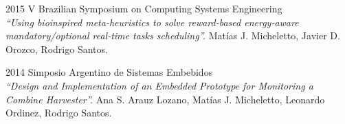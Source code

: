 \documentclass[letterpaper]{twentysecondcv} %
\begin{document}
\begin{twenty}
\twentyitem
    {2015}
    {}
    {V Brazilian Symposium on Computing Systems Engineering\\}
    {\textit{``Using bioinspired meta-heuristics to solve reward-based energy-aware mandatory/optional real-time tasks scheduling''.}}
    {Matías J. Micheletto, Javier D. Orozco, Rodrigo Santos.}
    
\twentyitem
    {2014}
    {}
    {Simposio Argentino de Sistemas Embebidos\\}
    {\textit{``Design and Implementation of an Embedded Prototype for Monitoring a Combine Harvester''.}}
    {Ana S. Arauz Lozano, Matías J. Micheletto, Leonardo Ordinez, Rodrigo Santos.}
    
\end{twenty}
\end{document}
